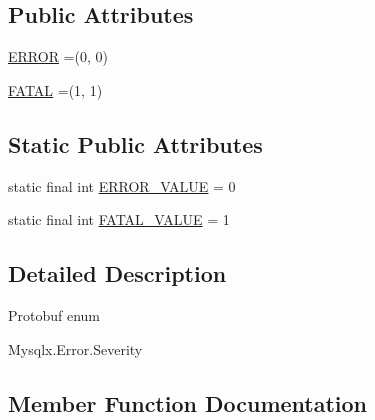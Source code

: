 \subsection*{Public Attributes}
\begin{DoxyCompactItemize}
\item 
\mbox{\hyperlink{enumcom_1_1mysql_1_1cj_1_1x_1_1protobuf_1_1_mysqlx_1_1_error_1_1_severity_a59b233ff90db9a379625c410973029dc}{E\+R\+R\+OR}} =(0, 0)
\item 
\mbox{\hyperlink{enumcom_1_1mysql_1_1cj_1_1x_1_1protobuf_1_1_mysqlx_1_1_error_1_1_severity_a3a5b48cfa733ad7766226ee47d1f7223}{F\+A\+T\+AL}} =(1, 1)
\end{DoxyCompactItemize}
\subsection*{Static Public Attributes}
\begin{DoxyCompactItemize}
\item 
static final int \mbox{\hyperlink{enumcom_1_1mysql_1_1cj_1_1x_1_1protobuf_1_1_mysqlx_1_1_error_1_1_severity_af26fb2a8fea5fe4b69df7bdf16cf80af}{E\+R\+R\+O\+R\+\_\+\+V\+A\+L\+UE}} = 0
\item 
static final int \mbox{\hyperlink{enumcom_1_1mysql_1_1cj_1_1x_1_1protobuf_1_1_mysqlx_1_1_error_1_1_severity_a9a7fd9a779b2f269f688463f2bd46392}{F\+A\+T\+A\+L\+\_\+\+V\+A\+L\+UE}} = 1
\end{DoxyCompactItemize}


\subsection{Detailed Description}
Protobuf enum
\begin{DoxyCode}
Mysqlx.Error.Severity 
\end{DoxyCode}
 

\subsection{Member Function Documentation}
\mbox{\label{enumcom_1_1mysql_1_1cj_1_1x_1_1protobuf_1_1_mysqlx_1_1_error_1_1_severity_adbaebbd562c962c4799803037fbb488b}} 
